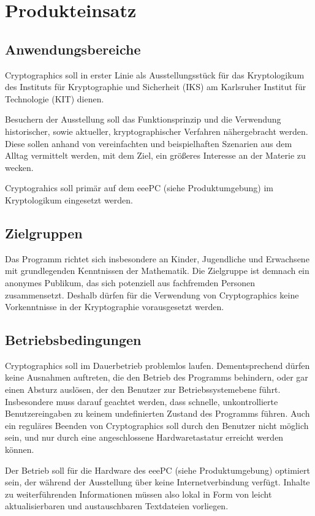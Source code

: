 \documentclass{article}
\begin{document}
\section{Produkteinsatz}
\subsection{Anwendungsbereiche}
Cryptographics soll in erster Linie als Ausstellungsstück für das Kryptologikum des Instituts für Kryptographie und Sicherheit (IKS) am Karlsruher Institut für Technologie (KIT) dienen.

Besuchern der Ausstellung soll das Funktionsprinzip und die Verwendung historischer, sowie aktueller, kryptographischer Verfahren nähergebracht werden. Diese sollen anhand von vereinfachten und beispielhaften Szenarien aus dem Alltag vermittelt werden, mit dem Ziel, ein größeres Interesse an der Materie zu wecken.

Cryptograhics soll primär auf dem eeePC (siehe Produktumgebung) im Kryptologikum eingesetzt werden.

\subsection{Zielgruppen}

Das Programm richtet sich insbesondere an Kinder, Jugendliche und Erwachsene mit grundlegenden Kenntnissen der Mathematik. Die Zielgruppe ist demnach ein anonymes Publikum, das sich potenziell aus fachfremden Personen zusammensetzt. Deshalb dürfen für die Verwendung von Cryptographics keine Vorkenntnisse in der Kryptographie vorausgesetzt werden.

\subsection{Betriebsbedingungen}

Cryptographics soll im Dauerbetrieb problemlos laufen. Dementsprechend dürfen keine Ausnahmen auftreten, die den Betrieb des Programms behindern, oder gar einen Absturz auslösen, der den Benutzer zur Betriebssystemebene führt. Insbesondere muss darauf geachtet werden, dass schnelle, unkontrollierte Benutzereingaben zu keinem undefinierten Zustand des Programms führen. Auch ein reguläres Beenden von Cryptographics soll durch den Benutzer nicht möglich sein, und nur durch eine angeschlossene Hardwaretastatur erreicht werden können.

Der Betrieb soll für die Hardware des eeePC (siehe Produktumgebung) optimiert sein, der während der Ausstellung über keine Internetverbindung verfügt. Inhalte zu weiterführenden Informationen müssen also lokal in Form von leicht aktualisierbaren und austauschbaren Textdateien vorliegen.
\end{document}
